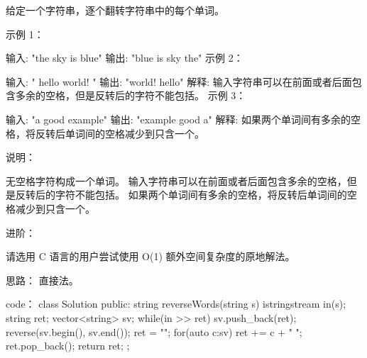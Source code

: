 给定一个字符串，逐个翻转字符串中的每个单词。

 

示例 1：

输入: "the sky is blue"
输出: "blue is sky the"
示例 2：

输入: "  hello world!  "
输出: "world! hello"
解释: 输入字符串可以在前面或者后面包含多余的空格，但是反转后的字符不能包括。
示例 3：

输入: "a good   example"
输出: "example good a"
解释: 如果两个单词间有多余的空格，将反转后单词间的空格减少到只含一个。
 

说明：

无空格字符构成一个单词。
输入字符串可以在前面或者后面包含多余的空格，但是反转后的字符不能包括。
如果两个单词间有多余的空格，将反转后单词间的空格减少到只含一个。
 

进阶：

请选用 C 语言的用户尝试使用 O(1) 额外空间复杂度的原地解法。
























思路：
直接法。






















code：
class Solution {
public:
    string reverseWords(string s) {
        istringstream in(s);
        string ret;
        vector<string> sv;
        while(in >> ret) sv.push_back(ret);
        reverse(sv.begin(), sv.end());
        ret = "";
        for(auto c:sv)
            ret += c + " ";
        ret.pop_back();
        return ret;
    }
};